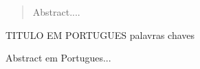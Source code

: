 

\begin{abstract}
Abstract....
\end{abstract}

\begin{englishabstract}
{TITULO EM PORTUGUES}
{palavras chaves}

Abstract em Portugues...


\end{englishabstract}
